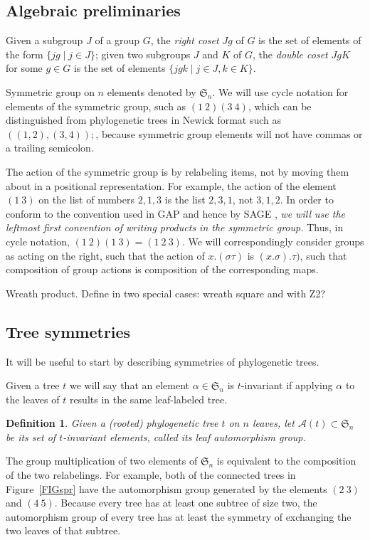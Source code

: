 \documentclass{amsart}
\newtheorem{definition}{Definition}
\newcommand{\fS}{\mathfrak S}
\newcommand{\aut}{\mathcal A}
\begin{document}
\subsection{Algebraic preliminaries}
Given a subgroup $J$ of a group $G$, the \emph{right coset} $Jg$ of $G$ is the set of elements of the form $\{jg \mid j \in J\}$;
given two subgroups $J$ and $K$ of $G$, the \emph{double coset} $JgK$ for some $g \in G$ is the set of elements $\{jgk \mid j \in J, k \in K\}$.

Symmetric group on $n$ elements denoted by $\fS_n$.
We will use cycle notation for elements of the symmetric group, such as $(1\ 2) (3\ 4)$, which can be distinguished from phylogenetic trees in Newick format \cite{wiki:newick} such as $((1,2),(3,4));$, because symmetric group elements will not have commas or a trailing semicolon.

The action of the symmetric group is by relabeling items, not by moving them about in a positional representation.
For example, the action of the element $(1\ 3)$ on the list of numbers $2, 1, 3$ is the list $2, 3, 1$, not $3, 1, 2$.
In order to conform to the convention used in GAP \cite{GAP4} and hence by SAGE \cite{SteinJoyner2005}, \emph{we will use the leftmost first convention of writing products in the symmetric group.}
Thus, in cycle notation, $(1\ 2) (1\ 3) = (1\ 2\ 3)$.
We will correspondingly consider groups as acting on the right, such that the action of $x.(\sigma \tau)$ is $(x.\sigma).\tau)$, such that composition of group actions is composition of the corresponding maps.

Wreath product.
Define in two special cases: wreath square and with Z2?


\subsection{Tree symmetries}
It will be useful to start by describing symmetries of phylogenetic trees.

Given a tree $t$ we will say that an element $\alpha \in \fS_n$ is $t$-invariant if applying $\alpha$ to the leaves of $t$ results in the same leaf-labeled tree.
\begin{definition}
Given a (rooted) phylogenetic tree $t$ on $n$ leaves, let $\aut(t) \subset \fS_n$ be its set of $t$-invariant elements, called its leaf automorphism group.
\end{definition}
The group multiplication of two elements of $\fS_n$ is equivalent to the composition of the two relabelings.
For example, both of the connected trees in Figure~\ref{FIGspr} have the automorphism group generated by the elements $(2\ 3)$ and $(4\ 5)$.
Because every tree has at least one subtree of size two, the automorphism group of every tree has at least the symmetry of exchanging the two leaves of that subtree.
\end{document}
